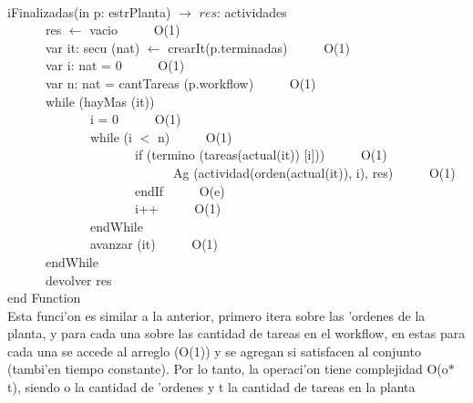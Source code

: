 \documentclass[a4paper,10pt]{article}
\begin{document}
\newpage

\begin{algoritmo}
\caption{}\\
  iFinalizadas(in p: estrPlanta) $\rightarrow$ $res$: actividades \\
	\indent \ \ \ \ \ \  res $\gets$ vacio  \ \ \ \ \ O(1)\\
	\indent \ \ \ \ \ \  var it: secu (nat) $\gets$ crearIt(p.terminadas)  \ \ \ \ \ O(1)\\
	\indent \ \ \ \ \ \  var i: nat = 0  \ \ \ \ \ O(1)\\
	\indent \ \ \ \ \ \  var n: nat = cantTareas (p.workflow)  \ \ \ \ \ O(1)\\
	\indent \ \ \ \ \ \  while (hayMas (it))  \ \ \ \ \ \\
	\indent \ \ \ \ \ \ \ \ \ \ \ \ \ i = 0 \ \ \ \ \ O(1) \\
	\indent \ \ \ \ \ \ \ \ \ \ \ \ \ while (i $<$ n) \ \ \ \ \ O(1) \\
	\indent \ \ \ \ \ \ \ \ \ \ \ \ \ \ \ \ \ \ \ \ if (termino (tareas(actual(it)) [i]))  \ \ \ \ \ O(1) \\
	\indent \ \ \ \ \ \ \ \ \ \ \ \ \ \ \ \ \ \ \ \ \ \ \ \ \ \  Ag (actividad(orden(actual(it)), i), res) \ \ \ \ \ O(1) \\
	\indent \ \ \ \ \ \ \ \ \ \ \ \ \ \ \ \ \ \ \ \ endIf \ \ \ \ \ O(e) \\
	\indent \ \ \ \ \ \ \ \ \ \ \ \ \ \ \ \ \ \ \ \ i++ \ \ \ \ \ O(1) \\
	\indent \ \ \ \ \ \ \ \ \ \ \ \ \ endWhile \ \ \ \ \ \\
	\indent \ \ \ \ \ \ \ \ \ \ \ \ \ avanzar (it) \ \ \ \ \ O(1)\\
	\indent \ \ \ \ \ \ endWhile \ \ \ \ \ \\
	\indent \ \ \ \ \ \  devolver res    \\
   end Function \\

Esta funci'on es similar a la anterior, primero itera sobre las 'ordenes de la planta, y para cada una sobre las cantidad de tareas en el workflow, en estas para cada una se accede al arreglo (O(1)) y se agregan si satisfacen al conjunto (tambi'en tiempo constante). Por lo tanto, la operaci'on tiene complejidad O(o$*$t), siendo o la cantidad de 'ordenes y t la cantidad de tareas en la planta
\end{algoritmo}
\end{document}
